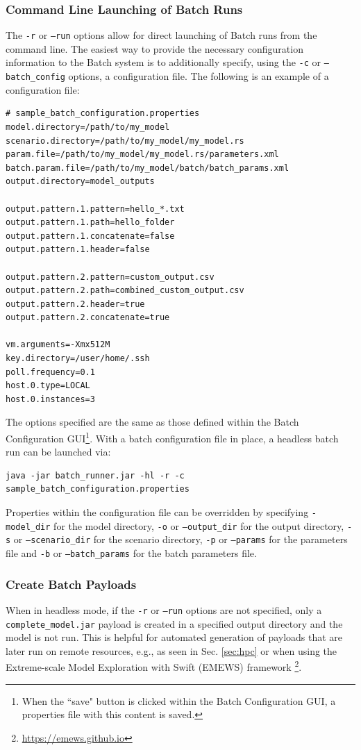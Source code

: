 \documentclass[11pt]{amsart}
\begin{document}
\subsubsection{Command Line Launching of Batch Runs}
The {\tt-r} or {\tt--run} options allow for direct launching of Batch runs from the command line. The easiest way to provide the necessary configuration information to the Batch system is to additionally specify, using the {\tt-c} or {\tt--batch\_config} options, a configuration file. The following is an example of a configuration file:
\begin{verbatim}
# sample_batch_configuration.properties
model.directory=/path/to/my_model
scenario.directory=/path/to/my_model/my_model.rs
param.file=/path/to/my_model/my_model.rs/parameters.xml
batch.param.file=/path/to/my_model/batch/batch_params.xml
output.directory=model_outputs

output.pattern.1.pattern=hello_*.txt
output.pattern.1.path=hello_folder
output.pattern.1.concatenate=false
output.pattern.1.header=false

output.pattern.2.pattern=custom_output.csv
output.pattern.2.path=combined_custom_output.csv
output.pattern.2.header=true
output.pattern.2.concatenate=true

vm.arguments=-Xmx512M
key.directory=/user/home/.ssh
poll.frequency=0.1
host.0.type=LOCAL
host.0.instances=3
\end{verbatim}

\noindent The options specified are the same as those defined within the Batch Configuration GUI\footnote{ When the ``save" button is clicked within the Batch Configuration GUI, a properties file with this content is saved.}. With a batch configuration file in place, a headless batch run can be launched via:
\begin{verbatim}
java -jar batch_runner.jar -hl -r -c sample_batch_configuration.properties
\end{verbatim}
Properties within the configuration file can be overridden by specifying {\tt-model\_dir} for the model directory, {\tt-o} or {\tt--output\_dir} for the output directory, {\tt-s} or {\tt--scenario\_dir} for the scenario directory, {\tt-p} or {\tt--params} for the parameters file and {\tt-b} or {\tt--batch\_params} for the batch parameters file.

\subsubsection{Create Batch Payloads}
When in headless mode, if the {\tt-r} or {\tt--run} options are not specified, only a {\tt complete\_model.jar} payload is created in a specified output directory and the model is not run. This is helpful for automated generation of payloads that are later run on remote resources, e.g., as seen in Sec. \ref{sec:hpc} or when using the Extreme-scale Model Exploration with Swift (EMEWS) framework \footnote{ \href{https://emews.github.io}{https://emews.github.io}}.
\end{document}
